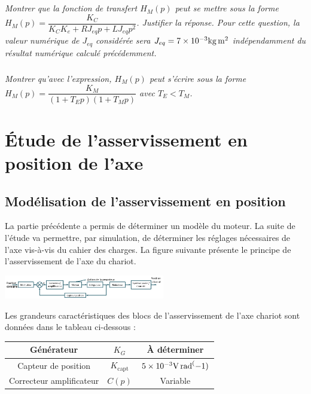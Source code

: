 \documentclass[10pt,fleqn]{article} %
\begin{document}
\begin{multicols}{2}
\subparagraph{}
\textit{Montrer que la fonction de transfert $H_M (p)$ peut se mettre sous la forme $H_M (p)=\dfrac{K_C}{K_C K_e+RJ_{eq} p+LJ_{eq} p^2 }$. Justifier la réponse. Pour cette question, la valeur numérique de $J_{eq}$ considérée sera $J_{eq}=\num{7d-3}\si{kg.m^2}$ indépendamment du résultat numérique calculé précédemment.}
\ifprof
\begin{corrige}
\end{corrige}
\else
\fi

\subparagraph{}
\textit{Montrer qu'avec l'expression, $H_M (p)$ peut s'écrire sous la forme $H_M (p)=\dfrac{K_M}{(1+T_E p)(1+T_M p)}$  avec $T_E<T_M$.}
\ifprof
\begin{corrige}
\end{corrige}
\else
\fi
\section*{Étude de l'asservissement en position de l'axe}
\subsection*{Modélisation de l'asservissement en position}
\ifprof
\else


La partie précédente a permis de déterminer un modèle du moteur. La suite de l'étude va permettre, par simulation, de déterminer les réglages nécessaires de l'axe vis-à-vis du cahier des charges. La figure suivante présente le principe de l'asservissement de l'axe du chariot.
 
\begin{center}
\includegraphics[width=7cm]{images/image9}
\end{center} 

Les grandeurs caractéristiques des blocs de l'asservissement de l'axe chariot sont données dans le tableau ci-dessous :
\begin{center}
\begin{tabular}{|c|c|c|}
\hline
Générateur & $K_G$ & À déterminer \\
\hline
Capteur de position	& $K_\text{capt}$ & $\num{5d-3}\si{V.rad^(-1)}$ \\
\hline
Correcteur amplificateur	 & $C(p)$ & Variable \\
\hline
\end{tabular}
\end{center}
\fi


\end{multicols}
\end{document}
